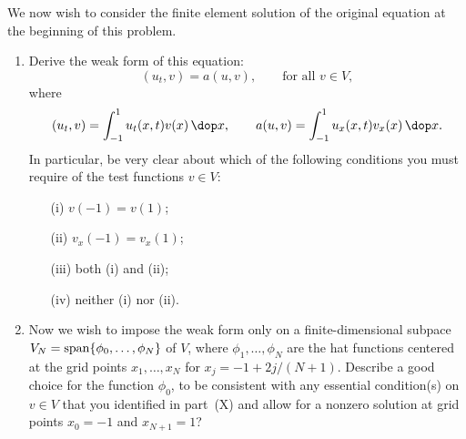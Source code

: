 \vspace*{1em}
We now wish to consider the finite element solution of the original equation
at the beginning of this problem.
\begin{enumerate}
\item Derive the weak form of this equation:  
      \[ (u_t,v) = a(u,v), \qquad \mbox{for all $v\in V$},\]
      where
      \[ (u_t,v) = \int_{-1}^1 u_t(x,t) v(x) \,\dop x, 
         \qquad a(u,v) = \int_{-1}^1  u_x(x,t) v_x(x)\,\dop x. \]
      In particular, be very clear about which of the following
      conditions you must require of the test functions $v\in V$:
\begin{enumerate}
\item[(i)] $v(-1)=v(1)$;
\item[(ii)] $v_x(-1)=v_x(1)$;
\item[(iii)] both (i) and (ii);
\item[(iv)]  neither (i) nor (ii).
\end{enumerate} 

\item Now we wish to impose the weak form only on a finite-dimensional
      subpace $V_N = {\rm span}\{\phi_0, \ldots, \phi_N\}$ of $V$,
      where $\phi_1, \ldots, \phi_N$ are the hat functions centered 
      at the grid points $x_1, \ldots, x_N$ for $x_j = -1+2j/(N+1)$.
      Describe a good choice for the function $\phi_0$, to be consistent 
      with any essential condition(s) on $v\in V$ that you identified in 
      part~(X) and allow for a nonzero solution at grid points 
      $x_0=-1$ and $x_{N+1}=1$?

\end{enumerate}
